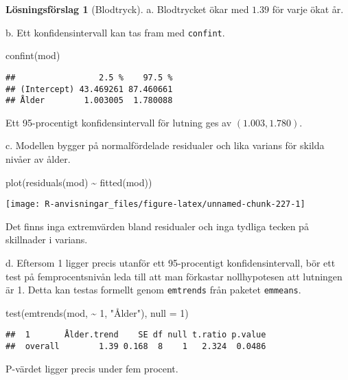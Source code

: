\documentclass[
]{book}
\newenvironment{Shaded}{\begin{snugshade}}{\end{snugshade}}
\newcommand{\AttributeTok}[1]{\textcolor[rgb]{0.77,0.63,0.00}{#1}}
\newcommand{\DecValTok}[1]{\textcolor[rgb]{0.00,0.00,0.81}{#1}}
\newcommand{\FunctionTok}[1]{\textcolor[rgb]{0.00,0.00,0.00}{#1}}
\newcommand{\NormalTok}[1]{#1}
\newcommand{\SpecialCharTok}[1]{\textcolor[rgb]{0.00,0.00,0.00}{#1}}
\newcommand{\StringTok}[1]{\textcolor[rgb]{0.31,0.60,0.02}{#1}}
\theoremstyle{definition}
\theoremstyle{definition}
\theoremstyle{definition}
\theoremstyle{definition}
\newtheorem{hypothesis}{Lösningsförslag}[chapter]
\theoremstyle{remark}
\begin{document}
\begin{hypothesis}[Blodtryck]
a. Blodtrycket ökar med \(1.39\) för varje ökat år.

b. Ett konfidensintervall kan tas fram med \texttt{confint}.

\begin{Shaded}
\begin{Highlighting}[]
\FunctionTok{confint}\NormalTok{(mod)}
\end{Highlighting}
\end{Shaded}

\begin{verbatim}
##                 2.5 %    97.5 %
## (Intercept) 43.469261 87.460661
## Ålder        1.003005  1.780088
\end{verbatim}

Ett 95-procentigt konfidensintervall för lutning ges av \((1.003, 1.780)\).

c. Modellen bygger på normalfördelade residualer och lika varians för skilda nivåer av ålder.

\begin{Shaded}
\begin{Highlighting}[]
\FunctionTok{plot}\NormalTok{(}\FunctionTok{residuals}\NormalTok{(mod) }\SpecialCharTok{\textasciitilde{}} \FunctionTok{fitted}\NormalTok{(mod))}
\end{Highlighting}
\end{Shaded}

\begin{center}\texttt{[image: R-anvisningar\_files/figure-latex/unnamed-chunk-227-1]} \end{center}

Det finns inga extremvärden bland residualer och inga tydliga tecken på skillnader i varians.

d. Eftersom 1 ligger precis utanför ett 95-procentigt konfidensintervall, bör ett test på femprocentsnivån leda till att man förkastar nollhypotesen att lutningen är 1. Detta kan testas formellt genom \texttt{emtrends} från paketet \texttt{emmeans}.

\begin{Shaded}
\begin{Highlighting}[]
\FunctionTok{test}\NormalTok{(}\FunctionTok{emtrends}\NormalTok{(mod, }\SpecialCharTok{\textasciitilde{}} \DecValTok{1}\NormalTok{, }\StringTok{"Ålder"}\NormalTok{), }\AttributeTok{null =} \DecValTok{1}\NormalTok{)}
\end{Highlighting}
\end{Shaded}

\begin{verbatim}
##  1       Ålder.trend    SE df null t.ratio p.value
##  overall        1.39 0.168  8    1   2.324  0.0486
\end{verbatim}

P-värdet ligger precis under fem procent.
\end{hypothesis}
\end{document}
